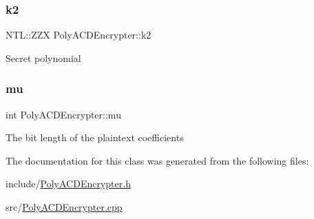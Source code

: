 \subsubsection{\texorpdfstring{k2}{k2}}
{\footnotesize\ttfamily N\+T\+L\+::\+Z\+ZX Poly\+A\+C\+D\+Encrypter\+::k2\hspace{0.3cm}{\ttfamily [private]}}

Secret polynomial \mbox{\label{classPolyACDEncrypter_a3afaccbe1fbc6379e6061f1489e9a253}} 
\subsubsection{\texorpdfstring{mu}{mu}}
{\footnotesize\ttfamily int Poly\+A\+C\+D\+Encrypter\+::mu\hspace{0.3cm}{\ttfamily [private]}}

The bit length of the plaintext coefficients 

The documentation for this class was generated from the following files\+:\begin{DoxyCompactItemize}
\item 
include/\hyperlink{PolyACDEncrypter_8h}{Poly\+A\+C\+D\+Encrypter.\+h}\item 
src/\hyperlink{PolyACDEncrypter_8cpp}{Poly\+A\+C\+D\+Encrypter.\+cpp}\end{DoxyCompactItemize}
